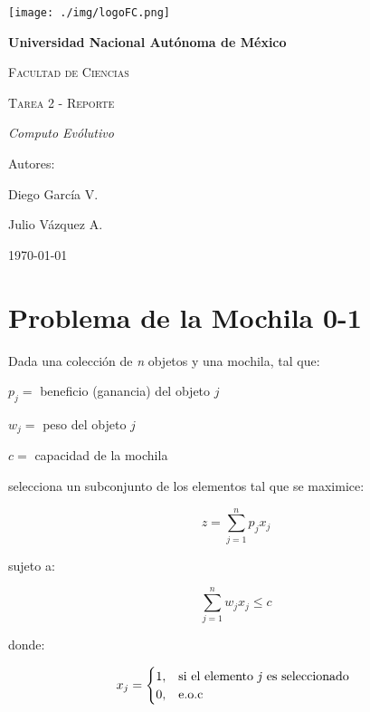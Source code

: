 \documentclass{article}
\begin{document}
\begin{titlepage}
{\texttt{[image: ./img/logoFC.png]}\par}
\vspace{1cm}
\centering
{\bfseries\huge Universidad Nacional Autónoma de México \par}
\vspace{1cm}
{\scshape\huge Facultad de Ciencias \par}
\vspace{2cm}
{\scshape\Huge Tarea 2 - Reporte\par}
\vspace{2cm}
{\itshape\LARGE Computo Evólutivo \par}
\vfill
{\large Autores: \par}
{\large Diego García V. \par}
{\large Julio Vázquez A. \par}
\vfill
{\Large \today \par}
\end{titlepage}

\section*{Problema de la Mochila 0-1 }
Dada una colección de \textit{n} objetos y una mochila, tal que:

\begin{center}
$p_j = $ beneficio (ganancia) del objeto $j$

$w_j = $ peso del objeto $j$

$c = $ capacidad de la mochila
\end{center}

selecciona un subconjunto de los elementos tal que se maximice:

\begin{equation*}
z = \sum_{j=1}^n p_jx_j
\end{equation*}

sujeto a:

\begin{equation*}
\sum_{j=1}^n w_{j}x_{j} \leq c
\end{equation*}

donde:


\begin{equation*}
 x_{j}=
\begin{cases}
1, & \text{si el elemento \textit{j} es seleccionado }\\
0,& \text{e.o.c }
\end{cases}
\end{equation*}
\end{document}
